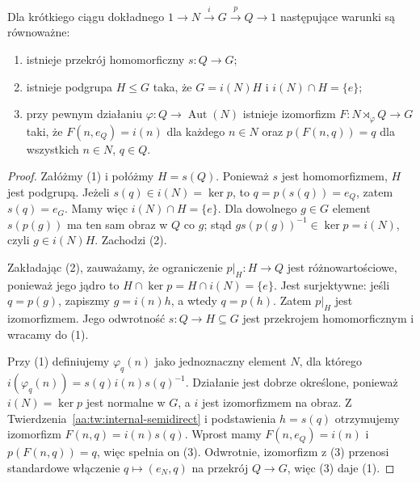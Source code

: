 \begin{twierdzenie}
\label{aa:tw:split-semidirect}
Dla krótkiego ciągu dokładnego
$1\to N\xrightarrow{i}G\xrightarrow{p}Q\to1$
następujące warunki są równoważne:
\begin{enumerate}
\item istnieje przekrój homomorficzny $s:Q\to G$;
\item istnieje podgrupa $H\le G$ taka, że
$G=i(N)H$ i $i(N)\cap H=\{e\}$;
\item przy pewnym działaniu $\varphi:Q\to\operatorname{Aut}(N)$
istnieje izomorfizm $F:N\rtimes_\varphi Q\to G$
taki, że $F(n,e_Q)=i(n)$ dla każdego $n\in N$ oraz
$p(F(n,q))=q$ dla wszystkich $n\in N$, $q\in Q$.
\end{enumerate}
\end{twierdzenie}
\begin{proof}
Załóżmy (1) i połóżmy $H=s(Q)$. Ponieważ $s$ jest homomorfizmem,
$H$ jest podgrupą. Jeżeli $s(q)\in i(N)=\ker p$,
to $q=p(s(q))=e_Q$, zatem $s(q)=e_G$.
Mamy więc $i(N)\cap H=\{e\}$.
Dla dowolnego $g\in G$ element $s(p(g))$ ma ten sam obraz
w $Q$ co $g$; stąd $g s(p(g))^{-1}\in\ker p=i(N)$,
czyli $g\in i(N)H$. Zachodzi (2).

Zakładając (2), zauważamy, że ograniczenie $p|_H:H\to Q$
jest różnowartościowe, ponieważ jego jądro to
$H\cap\ker p=H\cap i(N)=\{e\}$.
Jest surjektywne: jeśli $q=p(g)$, zapiszmy $g=i(n)h$,
a wtedy $q=p(h)$. Zatem $p|_H$ jest izomorfizmem.
Jego odwrotność $s:Q\to H\subseteq G$ jest przekrojem
homomorficznym i wracamy do (1).

Przy (1) definiujemy $\varphi_q(n)$ jako jednoznaczny element
$N$, dla którego $i(\varphi_q(n))=s(q)i(n)s(q)^{-1}$.
Działanie jest dobrze określone, ponieważ $i(N)=\ker p$
jest normalne w $G$, a $i$ jest izomorfizmem na obraz.
Z Twierdzenia~\ref{aa:tw:internal-semidirect}
i podstawienia $h=s(q)$ otrzymujemy izomorfizm
$F(n,q)=i(n)s(q)$. Wprost mamy
$F(n,e_Q)=i(n)$ i $p(F(n,q))=q$, więc spełnia on (3).
Odwrotnie, izomorfizm z (3) przenosi standardowe włączenie
$q\mapsto(e_N,q)$ na przekrój $Q\to G$, więc (3) daje (1).
\end{proof}

